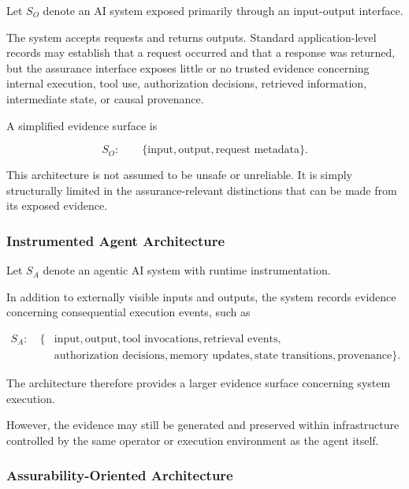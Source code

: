 Let \(S_O\) denote an AI system exposed primarily through an input-output
interface.

The system accepts requests and returns outputs.
Standard application-level records may establish that a request occurred
and that a response was returned, but the assurance interface exposes little
or no trusted evidence concerning internal execution, tool use,
authorization decisions, retrieved information, intermediate state,
or causal provenance.

A simplified evidence surface is

\begin{equation}
  S_O:
  \qquad
  \{
  \text{input},
  \text{output},
  \text{request metadata}
  \}.
\end{equation}

This architecture is not assumed to be unsafe or unreliable.
It is simply structurally limited in the assurance-relevant distinctions
that can be made from its exposed evidence.

\subsubsection{Instrumented Agent Architecture}

Let \(S_A\) denote an agentic AI system with runtime instrumentation.

In addition to externally visible inputs and outputs, the system records
evidence concerning consequential execution events, such as

\begin{equation}
  \begin{aligned}
    S_A:\quad
    \{ &
    \text{input},
    \text{output},
    \text{tool invocations},
    \text{retrieval events}, \\
       &
    \text{authorization decisions},
    \text{memory updates},
    \text{state transitions},
    \text{provenance}
    \}.
  \end{aligned}
\end{equation}

The architecture therefore provides a larger evidence surface concerning
system execution.

However, the evidence may still be generated and preserved within
infrastructure controlled by the same operator or execution environment
as the agent itself.

\subsubsection{Assurability-Oriented Architecture}

